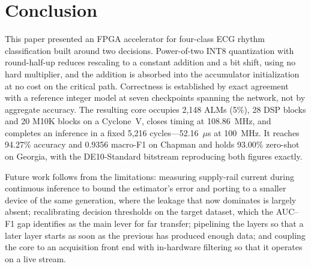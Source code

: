 \documentclass[conference,10pt]{IEEEtran}
\begin{document}
\section{Conclusion}

This paper presented an FPGA accelerator for four-class ECG rhythm classification
built around two decisions. Power-of-two INT8 quantization with round-half-up
reduces rescaling to a constant addition and a bit shift, using no hard
multiplier, and the addition is absorbed into the accumulator initialization at no
cost on the critical path. Correctness is established by exact agreement with a
reference integer model at seven checkpoints spanning the network, not by
aggregate accuracy. The resulting core occupies 2{,}148 ALMs (5\%), 28 DSP blocks
and 20 M10K blocks on a Cyclone~V, closes timing at 108.86~MHz, and completes an
inference in a fixed 5{,}216 cycles---52.16~$\mu$s at 100~MHz. It reaches 94.27\%
accuracy and 0.9356 macro-F1 on Chapman and holds 93.00\% zero-shot on Georgia,
with the DE10-Standard bitstream reproducing both figures exactly.

Future work follows from the limitations: measuring supply-rail current during
continuous inference to bound the estimator's error and porting to a smaller
device of the same generation, where the leakage that now dominates is largely
absent; recalibrating decision thresholds on the target dataset, which the
AUC--F1 gap identifies as the main lever for far transfer; pipelining the layers
so that a later layer starts as soon as the previous has produced enough data;
and coupling the core to an acquisition front end with in-hardware filtering so
that it operates on a live stream.
\end{document}

